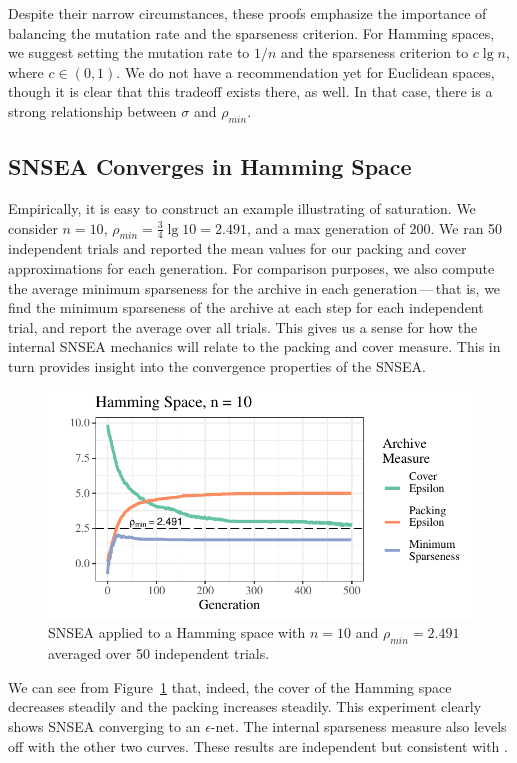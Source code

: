 \documentclass[twoside]{article}
\begin{document}
\vspace*{1ex}

Despite their narrow circumstances, these proofs emphasize the importance of balancing the mutation rate and the sparseness criterion.  For Hamming spaces, we suggest setting the mutation rate to $1/n$ and the sparseness criterion to $c\lg n$, where $c\in (0,1)$.  We do not have a recommendation yet for Euclidean spaces, though it is clear that this tradeoff exists there, as well.  In that case, there is a strong relationship between $\sigma$ and $\rho_{min}$.


\subsection{SNSEA Converges in Hamming Space}
\label{subsec:hamming}

Empirically, it is easy to construct an example illustrating of saturation.  We consider $n=10$, $\rho_{min} = \frac{3}{4} \lg 10 = 2.491$, and a max generation of 200.  We ran 50 independent trials and reported the mean values for our packing and cover approximations for each generation.  For comparison purposes, we also compute the average minimum sparseness for the archive in each generation\,---\,that is, we find the minimum sparseness of the archive at each step for each independent trial, and report the average over all trials.  This gives us a sense for how the internal SNSEA mechanics will relate to the packing and cover measure.  This in turn provides insight into the convergence properties of the SNSEA.
%
\begin{figure}[t]
  \center\includegraphics[width=1\textwidth]{Figures/hamming-500-n10-NOPOP.pdf}
  \caption{\label{fig:hamming:nopop:n10} SNSEA applied to a Hamming space with $n=10$ and $\rho_{min} = 2.491$ averaged over 50 independent trials.}
\end{figure}
%
We can see from Figure~\ref{fig:hamming:nopop:n10} that, indeed, the cover of the Hamming space decreases steadily and the packing increases steadily.  This experiment clearly shows SNSEA converging to an $\epsilon$-net.  The internal sparseness measure also levels off with the other two curves.  These results are independent but consistent with \citep{Wiegand2020flairs}.  
\end{document}

